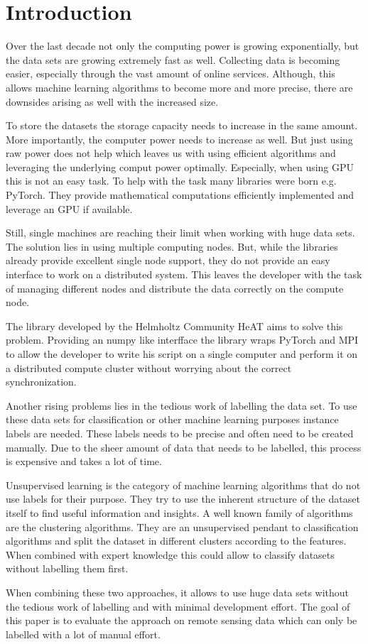 
\section{Introduction}
\label{sec:intro}
Over the last decade not only the computing power is growing exponentially, but the data sets are growing extremely fast as well.
Collecting data is becoming easier, especially through the vast amount of online services.
Although, this allows machine learning algorithms to become more and more precise, there are downsides arising as well with
the increased size.

To store the datasets the storage capacity needs to increase in the same amount. More importantly, the computer power needs to increase
as well. But just using raw power does not help which leaves us with using efficient algorithms and leveraging the underlying comput power optimally.
Especially, when using \gls{GPU} this is not an easy task. To help with the task many libraries were born e.g. PyTorch.
They provide mathematical computations efficiently implemented and leverage an \gls{GPU} if available.

Still, single machines are reaching their limit when working with huge data sets. The solution lies in using multiple computing nodes.
But, while the libraries already provide excellent single node support, they do not provide an easy interface to work on a distributed system.
This leaves the developer with the task of managing different nodes and distribute the data correctly on the compute node.

The library developed by the Helmholtz Community \gls{HeAT} aims to solve this problem.
Providing an \gls{numpy} like interfface the library wraps \gls{PyTorch} and \gls{MPI} to allow the developer to write his script on a single computer
and perform it on a distributed compute cluster without worrying about the correct synchronization.

Another rising problems lies in the tedious work of labelling the data set.
To use these data sets for classification or other machine learning purposes instance labels are needed.
These labels needs to be precise and often need to be created manually.
Due to the sheer amount of data that needs to be labelled, this process is expensive and takes a lot of time.

Unsupervised learning is the category of machine learning algorithms that do not use labels for their purpose. They try to
use the inherent structure of the dataset itself to find useful information and insights.
A well known family of algorithms are the clustering algorithms. They are an unsupervised pendant to classification algorithms
and split the dataset in different clusters according to the features.
When combined with expert knowledge this could allow to classify datasets without labelling them first.

When combining these two approaches, it allows to use huge data sets without the tedious work of labelling and with minimal development effort.
The goal of this paper is to evaluate the approach on remote sensing data which can only be labelled with a lot of manual effort.
